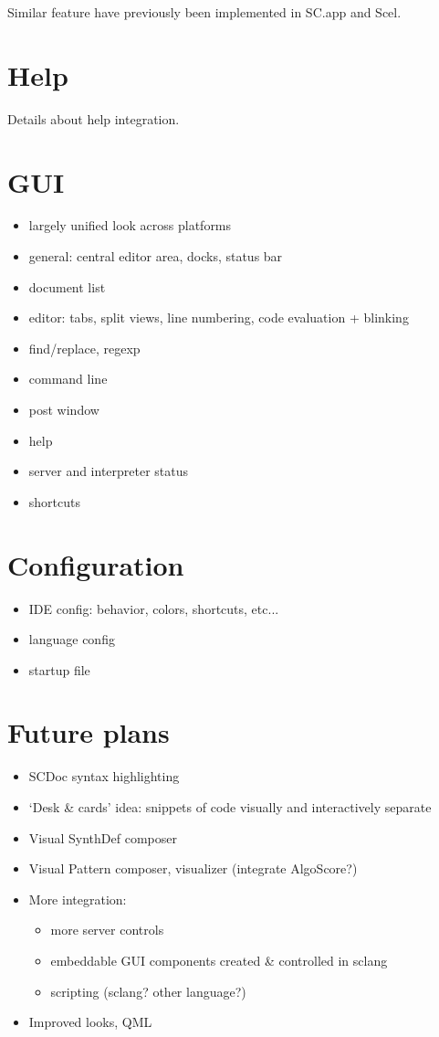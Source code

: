 \documentclass[11pt,a4paper]{article}
\begin{document}
Similar feature have previously been implemented in SC.app and Scel.

\section{Help}

Details about help integration.

\section{GUI}

\begin{itemize}
 \item largely unified look across platforms
 \item general: central editor area, docks, status bar
 \item document list
 \item editor: tabs, split views, line numbering, code evaluation + blinking
 \item find/replace, regexp
 \item command line
 \item post window
 \item help
 \item server and interpreter status
 \item shortcuts
\end{itemize}

\section{Configuration}

\begin{itemize}
 \item IDE config: behavior, colors, shortcuts, etc...
 \item language config
 \item startup file
\end{itemize}


\section{Future plans}

\begin{itemize}
 \item SCDoc syntax highlighting
 \item `Desk \& cards' idea: snippets of code visually and interactively separate
 \item Visual SynthDef composer
 \item Visual Pattern composer, visualizer (integrate AlgoScore?)
 \item More integration:
 \begin{itemize}
    \item more server controls
    \item  embeddable GUI components created \& controlled in sclang
    \item  scripting (sclang? other language?)
 \end{itemize}
 \item Improved looks, QML
\end{itemize}
\end{document}

